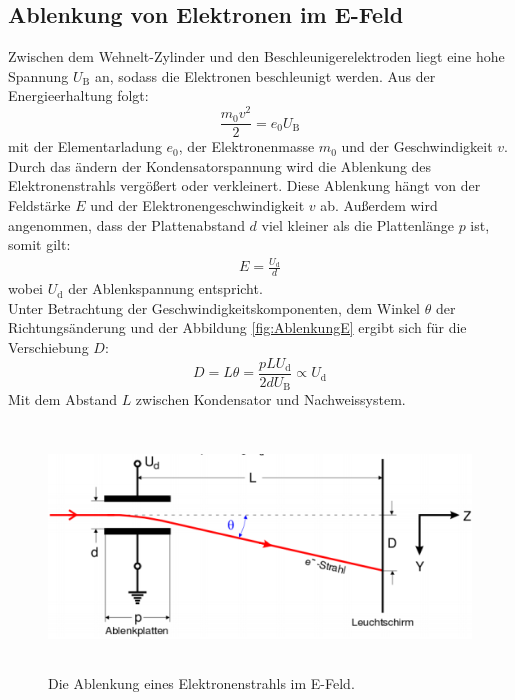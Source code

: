 \subsection{Ablenkung von Elektronen im E-Feld}
Zwischen dem Wehnelt-Zylinder und den Beschleunigerelektroden liegt eine hohe Spannung $U_\text{B}$ an, sodass die Elektronen beschleunigt werden. Aus der Energieerhaltung folgt:
\begin{equation}
	\frac{m_0 v^2}{2} = e_0 U_\text{B}
\end{equation}
mit der Elementarladung $e_0$, der Elektronenmasse $m_0$ und der Geschwindigkeit $v$. \\
Durch das ändern der Kondensatorspannung wird die Ablenkung des Elektronenstrahls vergößert oder verkleinert. Diese Ablenkung hängt von der Feldstärke $E$ und der Elektronengeschwindigkeit $v$ ab. Außerdem wird angenommen, dass der Plattenabstand $d$ viel kleiner als die Plattenlänge $p$ ist, somit gilt:
\begin{align*}
	E = \frac{U_\text{d}}{d}
\end{align*}
wobei $U_\text{d}$ der Ablenkspannung entspricht. \\
Unter Betrachtung der Geschwindigkeitskomponenten, dem Winkel $\theta$ der Richtungsänderung und der Abbildung \eqref{fig:AblenkungE} ergibt sich für die Verschiebung $D$:
\begin{equation}
	D = L\theta = \frac{p L U_\text{d}}{2 d U_\text{B}} \propto U_\text{d}
\end{equation}
Mit dem Abstand $L$ zwischen Kondensator und Nachweissystem. \\

\begin{figure}[H]
	\centering
	\includegraphics[height=6.5cm]{picture/AblenkungEFeld}
	\caption{Die Ablenkung eines Elektronenstrahls im E-Feld. \cite[3]{V501}}
	\label{fig:AblenkungE}
\end{figure}


